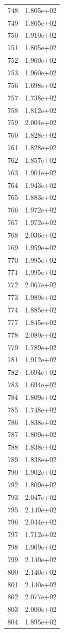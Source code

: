 \documentclass[12pt]{article}
\begin{document}
\begin{longtable}{@{}cc@{}}
748 & 1.805e+02 \\
749 & 1.805e+02 \\
750 & 1.910e+02 \\
751 & 1.805e+02 \\
752 & 1.960e+02 \\
753 & 1.960e+02 \\
756 & 1.698e+02 \\
757 & 1.738e+02 \\
758 & 1.812e+02 \\
759 & 2.004e+02 \\
760 & 1.828e+02 \\
761 & 1.828e+02 \\
762 & 1.857e+02 \\
763 & 1.901e+02 \\
764 & 1.943e+02 \\
765 & 1.883e+02 \\
766 & 1.972e+02 \\
767 & 1.972e+02 \\
768 & 2.036e+02 \\
769 & 1.959e+02 \\
770 & 1.995e+02 \\
771 & 1.995e+02 \\
772 & 2.067e+02 \\
773 & 1.989e+02 \\
774 & 1.885e+02 \\
777 & 1.845e+02 \\
778 & 2.089e+02 \\
779 & 1.789e+02 \\
781 & 1.912e+02 \\
782 & 1.694e+02 \\
783 & 1.694e+02 \\
784 & 1.809e+02 \\
785 & 1.748e+02 \\
786 & 1.838e+02 \\
787 & 1.809e+02 \\
788 & 1.838e+02 \\
789 & 1.838e+02 \\
790 & 1.902e+02 \\
792 & 1.809e+02 \\
793 & 2.047e+02 \\
795 & 2.149e+02 \\
796 & 2.044e+02 \\
797 & 1.712e+02 \\
798 & 1.969e+02 \\
799 & 2.140e+02 \\
800 & 2.140e+02 \\
801 & 2.140e+02 \\
802 & 2.077e+02 \\
803 & 2.000e+02 \\
804 & 1.895e+02 \\

\bottomrule
\end{longtable}
\end{document}
